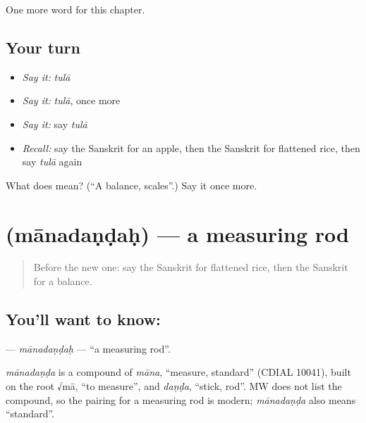 \begin{grammarlens}[title={What you've built}]
One more word for this chapter.
\end{grammarlens}

\subsection*{Your turn}
\begin{itemize}
\raggedright
  \item \emph{Say it:} \emph{tulā}
  \item \emph{Say it:} \emph{tulā}, once more
  \item \emph{Say it:} say \emph{tulā}
  \item \emph{Recall:} say the Sanskrit for an apple, then the Sanskrit for flattened rice, then say \emph{tulā} again
\end{itemize}

\begin{tcolorbox}[breakable,colback=teal!4,colframe=teal!35!black,title={Before you move on}]
What does  mean? (\textquotedblleft{}A balance, scales\textquotedblright{}.) Say it once more.
\end{tcolorbox}
\section[\texorpdfstring{\sk{मानदण्डः} (mānadaṇḍaḥ)}{मानदण्डः (mānadaṇḍaḥ)}]{ (mānadaṇḍaḥ) — a measuring rod}

\label{lesson:SA-C220-manadandah}



\begin{quote}
Before the new one: say the Sanskrit for flattened rice, then the Sanskrit for a balance.
\end{quote}

\subsection*{You'll want to know: }
\textbf{} — \emph{mānadaṇḍaḥ} — \textquotedblleft{}a measuring rod\textquotedblright{}.

\begin{cousinweb}
\emph{mānadaṇḍa} is a compound of \emph{māna}, \textquotedblleft{}measure, standard\textquotedblright{} (CDIAL 10041), built on the root √mā, \textquotedblleft{}to measure\textquotedblright{}, and \emph{daṇḍa}, \textquotedblleft{}stick, rod\textquotedblright{}. MW does not list the compound, so the pairing for a measuring rod is modern; \emph{mānadaṇḍa} also means \textquotedblleft{}standard\textquotedblright{}.
\end{cousinweb}

